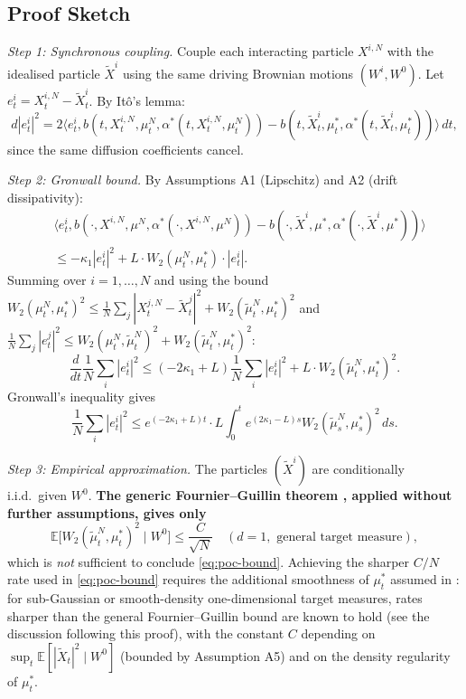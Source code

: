 \subsection{Proof Sketch}

\textit{Step 1: Synchronous coupling.} Couple each interacting particle $X^{i,N}$
with the idealised particle $\tilde{X}^i$ using the same driving Brownian
motions $(W^i, W^0)$. Let $e_t^i = X_t^{i,N} - \tilde{X}_t^i$. By
It\^{o}'s lemma:
\[
    d|e_t^i|^2 = 2\langle e_t^i, b(t, X_t^{i,N}, \mu_t^N, \alpha^*(t,X_t^{i,N},
    \mu_t^N)) - b(t, \tilde X_t^i, \mu_t^*, \alpha^*(t, \tilde X_t^i,
    \mu_t^*))\rangle\, dt,
\]
since the same diffusion coefficients cancel.

\textit{Step 2: Gronwall bound.} By Assumptions A1 (Lipschitz) and A2 (drift
dissipativity):
\begin{align*}
    &\langle e_t^i, b(\cdot, X^{i,N}, \mu^N, \alpha^*(\cdot,X^{i,N},\mu^N))
    - b(\cdot, \tilde X^i, \mu^*, \alpha^*(\cdot,\tilde X^i,\mu^*))\rangle \\
    &\le -\kappa_1 |e_t^i|^2 + L \cdot W_2(\mu_t^N, \mu_t^*) \cdot |e_t^i|.
\end{align*}
Summing over $i = 1, \ldots, N$ and using the bound
$W_2(\mu_t^N, \mu_t^*)^2 \le \frac{1}{N}\sum_j |X_t^{j,N} - \tilde X_t^j|^2 +
W_2(\tilde\mu_t^N, \mu_t^*)^2$ and $\frac{1}{N}\sum_j |e_t^j|^2 \le
W_2(\mu_t^N, \tilde\mu_t^N)^2 + W_2(\tilde\mu_t^N,\mu_t^*)^2$:
\[
    \frac{d}{dt}\frac{1}{N}\sum_i |e_t^i|^2 \le (-2\kappa_1 + L)
    \frac{1}{N}\sum_i |e_t^i|^2 + L \cdot W_2(\tilde\mu_t^N, \mu_t^*)^2.
\]
Gronwall's inequality gives
\[
    \frac{1}{N}\sum_i |e_t^i|^2 \le e^{(-2\kappa_1+L)t} \cdot L \int_0^t
    e^{(2\kappa_1-L)s} W_2(\tilde\mu_s^N, \mu_s^*)^2\, ds.
\]

\textit{Step 3: Empirical approximation.} The particles $(\tilde{X}^i)$ are
conditionally i.i.d.\ given $W^0$. \textbf{The generic Fournier--Guillin theorem
\citep{fournierguillin2015}, applied without further assumptions, gives only}
\[
    \mathbb{E}\big[W_2(\tilde\mu_t^N, \mu_t^*)^2 \mid W^0\big] \le
    \frac{C}{\sqrt{N}}
    \quad (d = 1, \text{ general target measure}),
\]
which is \emph{not} sufficient to conclude \eqref{eq:poc-bound}. Achieving the
sharper $C/N$ rate used in \eqref{eq:poc-bound} requires the additional
smoothness of $\mu_t^*$ assumed in : for sub-Gaussian or smooth-density
one-dimensional target measures, rates sharper than the general
Fournier--Guillin bound are known to hold (see the discussion following this
proof), with the constant $C$ depending on $\sup_t \mathbb{E}[|\tilde X_t|^2 \mid
W^0]$ (bounded by Assumption A5) and on the density regularity of $\mu_t^*$.

